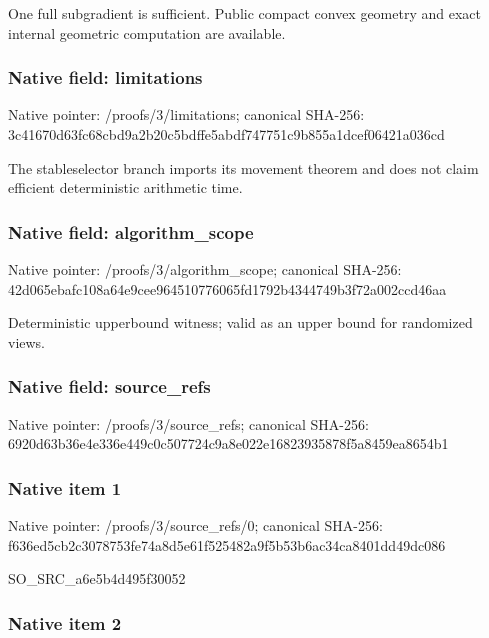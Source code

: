 \documentclass[10pt,a4paper]{article}
\begin{document}
One full subgradient is sufficient. Public compact convex geometry and exact internal geometric computation are available.


\subsubsection{Native field: limitations}


Native pointer: /proofs/3/limitations; canonical SHA-256: 3c41670d63fc68cbd9a2b20c\allowbreak{}5bdffe5abdf747751c9b855a\allowbreak{}1dcef06421a036cd


The stableselector branch imports its movement theorem and does not claim efficient deterministic arithmetic time.


\subsubsection{Native field: algorithm\_scope}


Native pointer: /proofs/3/algorithm\_scope; canonical SHA-256: 42d065ebafc108a64e9cee96\allowbreak{}4510776065fd1792b4344749\allowbreak{}b3f72a002ccd46aa


Deterministic upperbound witness; valid as an upper bound for randomized views.


\subsubsection{Native field: source\_refs}


Native pointer: /proofs/3/source\_refs; canonical SHA-256: 6920d63b36e4e336e449c0c5\allowbreak{}07724c9a8e022e1682393587\allowbreak{}8f5a8459ea8654b1



\subsubsection{Native item 1}


Native pointer: /proofs/3/source\_refs/0; canonical SHA-256: f636ed5cb2c3078753fe74a8\allowbreak{}d5e61f525482a9f5b53b6ac3\allowbreak{}4ca8401dd49dc086


SO\_SRC\_a6e5b4d495f30052


\subsubsection{Native item 2}
\end{document}
